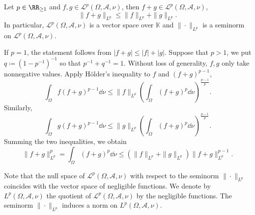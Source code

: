 \begin{theoremenv}\label{thm:8.2.4}
    Let $p \in \RR_{\ge 1}$ and $f,g \in \mathcal{L}^{p}(\Omega,\mathscr{A},\nu)$, then $f + g \in \mathcal{L}^{p}(\Omega,\mathscr{A},\nu)$,
    $$\|f + g\|_{L^{p}} \le \|f\|_{L^{p}} + \|g\|_{L^{p}}.$$
    In particular, $\mathcal{L}^{p}(\Omega,\mathscr{A},\nu)$ is a vector space over $\mathbb{K}$ and $\|\cdot\|_{L^{p}}$ is a seminorm on $\mathcal{L}^{p}(\Omega,\mathscr{A},\nu).$
\end{theoremenv}
\begin{proofenv}
    If $p = 1$, the statement follows from $|f + g| \le |f| + |g|$.
    Suppose that $p > 1$, we put $q \coloneq (1 - p^{-1})^{-1}$ so that $p^{-1} + q^{-1} = 1$.
    Without loss of generality, $f,g$ only take nonnegative values.
    Apply Hölder's inequality to $f$ and $(f + g)^{p-1}$,
    $$\int_{\Omega} f(f + g)^{p-1} \dd \nu \le \|f\|_{L^p} \left(\int_{\Omega} (f + g)^{p} \dd \nu\right)^{\frac{p-1}{p}}.$$
    Similarly,
    $$\int_{\Omega} g(f + g)^{p-1} \dd \nu \le \|g\|_{L^p} \left(\int_{\Omega} (f + g)^{p} \dd \nu\right)^{\frac{p-1}{p}}.$$
    Summing the two inequalities, we obtain
    $$\|f+g\|^p_{L^p} = \int_{\Omega} (f + g)^{p} \dd \nu \le (\|f\|_{L^p} + \|g\|_{L^p}) \|f+g\|_{L^p}^{p-1}.$$
\end{proofenv}

\begin{remark}
    Note that the null space of $\mathcal{L}^p(\Omega,\mathscr{A},\nu)$ with respect to the seminorm $\|\cdot\|_{L^p}$ coincides with the vector space of negligible functions.
    We denote by $L^p(\Omega,\mathscr{A},\nu)$ the quotient of $\mathcal{L}^p(\Omega,\mathscr{A},\nu)$ by the negligible functions.
    The seminorm $\|\cdot\|_{L^p}$ induces a norm on $L^p(\Omega,\mathscr{A},\nu)$.
\end{remark}

